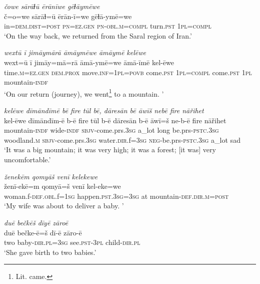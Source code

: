 \ea \label{ZQ.10}
\textit{čowe sārāɫū ērānīwe gēɫāymēwe} \\ 
\gll č=o=we sārāɫ=ū ērān-ī=we gēɫā-ymē=we \\ 
 in=\textsc{dem.dist}\textsc{=\textsc{post}} \textsc{pn}\textsc{=ez.gen} \textsc{pn}\textsc{-obl}\textsc{.m}\textsc{=compl} turn\textsc{.pst} \textsc{1pl}\textsc{=compl} \\ 
\glt `On the way back, we returned from the Saral region of Iran.'
\z 
 
\ea \label{ZQ.11}
\textit{wextū ī jimāymārā āmāymēwe āmāymē kelēwe} \\ 
\gll wext=ū ī jimāy=mā=rā āmā-ymē=we āmā-īmē kel-ēwe \\ 
 time\textsc{.m}\textsc{=ez.gen} \textsc{dem.prox} move\textsc{.inf}\textsc{=\textsc{1pl}}\textsc{=\textsc{povb}} come\textsc{.pst} \textsc{1pl}\textsc{=compl} come\textsc{.pst} \textsc{1pl} mountain\textsc{-indf} \\ 
\glt `On our return (journey), we went\footnote{Lit. came.}  to a mountain. '
\z 
 
\ea \label{ZQ.12}
\textit{kelēwe dīmāndīmē bē fire tūl bē, dāresān bē āwīš nebē fire nāřihet} \\ 
\gll kel-ēwe dīmāndīm-ē b-ē fire tūl b-ē dāresān b-ē āwī=š ne-b-ē fire nāřihet \\ 
 mountain\textsc{-indf} wide\textsc{-indf} \textsc{sbjv-}come.prs\textsc{.3sg} a\_lot long be.prs\textsc{-pstc}\textsc{.3sg} woodland\textsc{.m} \textsc{sbjv-}come.prs\textsc{.3sg} water\textsc{.dir}.f\textsc{=3sg} \textsc{neg-}be.prs\textsc{-pstc}\textsc{.3sg} a\_lot sad \\ 
\glt `It was a big mountain; it was very high; it was a forest; [it was] very uncomfortable.'
\z 
 
\ea \label{ZQ.14}
\textit{ženekēm qomyāš venī kelekewe} \\ 
\gll ženī-ekē=m qomyā=š venī kel-eke=we \\ 
 woman.f\textsc{-def}\textsc{.obl}.f\textsc{=\textsc{1sg}} happen\textsc{.pst}\textsc{.3sg}\textsc{=3sg} at mountain\textsc{-def}\textsc{.dir}\textsc{.m}\textsc{=\textsc{post}} \\ 
\glt `My wife was about to deliver a baby. '
\z 
 
\ea \label{ZQ.15}
\textit{duē bečkēš dīyē zāroē} \\ 
\gll duē bečke-ē=š dī-ē zāro-ē \\ 
 two baby\textsc{-dir}\textsc{.pl}\textsc{=3sg} see\textsc{.pst}\textsc{-3pl} child\textsc{-dir}\textsc{.pl} \\ 
\glt `She gave birth to two babies.'
\z 
 
